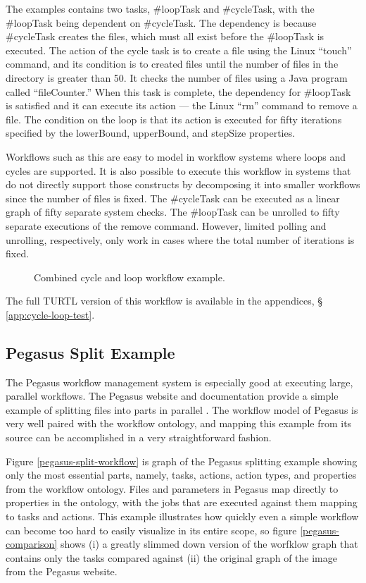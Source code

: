 The examples contains two tasks, \#loopTask and \#cycleTask, with the \#loopTask
being dependent on \#cycleTask. The dependency is because \#cycleTask
creates the files, which must all exist before the \#loopTask is executed. The
action of the cycle task is to create a file using the Linux ``touch'' command,
and its condition is to created files until the number of files in the directory
is greater than 50. It checks the number of files using a Java program called
``fileCounter.'' When this task is complete, the dependency for \#loopTask is
satisfied and it can execute its action --- the Linux ``rm'' command to remove a
file. The condition on the loop is that its action is executed for fifty
iterations specified by the lowerBound, upperBound, and stepSize properties.

Workflows such as this are easy to model in workflow systems where loops and
cycles are supported. It is also possible to execute this workflow in systems
that do not directly support those constructs by decomposing it into smaller
workflows since the number of files is fixed. The \#cycleTask can be
executed as a linear graph of fifty separate system checks. The \#loopTask can
be unrolled to fifty separate executions of the remove command. However, limited
polling and unrolling, respectively, only work in cases where the total number
of iterations is fixed.

\begin{figure}[htbp]
\centering
{}
\caption{Combined cycle and loop workflow example.}
\label{cycle-loop-test}
\end{figure}

The full TURTL version of this workflow is available in the appendices, \S
\ref{app:cycle-loop-test}.

\subsection{Pegasus Split Example}

The Pegasus workflow management system is especially good at executing large,
parallel workflows. The Pegasus website and documentation provide a simple
example of splitting files into parts in parallel
\cite{noauthor_workflow_nodate}. The workflow model of Pegasus is very well
paired with the workflow ontology, and mapping this example from its source can
be accomplished in a very straightforward fashion.

Figure \ref{pegasus-split-workflow} is graph of the Pegasus splitting example
showing only the most essential parts, namely, tasks, actions, action types, and
properties from the workflow ontology. Files and parameters in Pegasus map
directly to properties in the ontology, with the jobs that are executed against
them mapping to tasks and actions. This example illustrates how quickly even a
simple workflow can become too hard to easily visualize in its entire scope, so
figure \ref{pegasus-comparison} shows (i) a greatly slimmed down version of the
worfklow graph that contains only the tasks compared against (ii) the original
graph of the image from the Pegasus website.

